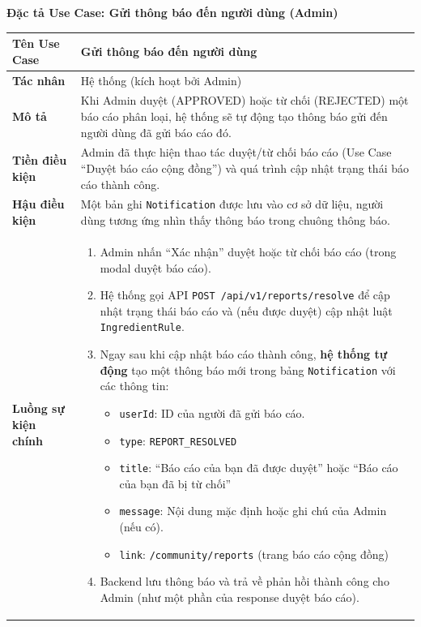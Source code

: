 \documentclass[12pt,a4paper]{article}
\begin{document}
\vspace{0.5cm}
\textbf{Đặc tả Use Case: Gửi thông báo đến người dùng (Admin)}

\begin{center}
\renewcommand{\arraystretch}{1.4}
\begin{tabular}{|p{4cm}|p{10cm}|}
\hline
\rowcolor{blue!15}
\textbf{Tên Use Case} & \textbf{Gửi thông báo đến người dùng} \\ \hline
\textbf{Tác nhân} & Hệ thống (kích hoạt bởi Admin) \\ \hline
\textbf{Mô tả} & Khi Admin duyệt (APPROVED) hoặc từ chối (REJECTED) một báo cáo phân loại, hệ thống sẽ tự động tạo thông báo gửi đến người dùng đã gửi báo cáo đó. \\ \hline
\textbf{Tiền điều kiện} & Admin đã thực hiện thao tác duyệt/từ chối báo cáo (Use Case “Duyệt báo cáo cộng đồng”) và quá trình cập nhật trạng thái báo cáo thành công. \\ \hline
\textbf{Hậu điều kiện} & Một bản ghi \texttt{Notification} được lưu vào cơ sở dữ liệu, người dùng tương ứng nhìn thấy thông báo trong chuông thông báo. \\ \hline
\textbf{Luồng sự kiện chính} & 
\begin{enumerate}
    \item Admin nhấn “Xác nhận” duyệt hoặc từ chối báo cáo (trong modal duyệt báo cáo).
    \item Hệ thống gọi API \texttt{POST /api/v1/reports/resolve} để cập nhật trạng thái báo cáo và (nếu được duyệt) cập nhật luật \texttt{IngredientRule}.
    \item Ngay sau khi cập nhật báo cáo thành công, \textbf{hệ thống tự động} tạo một thông báo mới trong bảng \texttt{Notification} với các thông tin:
        \begin{itemize}
            \item \texttt{userId}: ID của người đã gửi báo cáo.
            \item \texttt{type}: \texttt{REPORT\_RESOLVED}
            \item \texttt{title}: “Báo cáo của bạn đã được duyệt” hoặc “Báo cáo của bạn đã bị từ chối”
            \item \texttt{message}: Nội dung mặc định hoặc ghi chú của Admin (nếu có).
            \item \texttt{link}: \texttt{/community/reports} (trang báo cáo cộng đồng)
        \end{itemize}
    \item Backend lưu thông báo và trả về phản hồi thành công cho Admin (như một phần của response duyệt báo cáo).

\end{enumerate}
\end{tabular}
\end{center}
\end{document}
